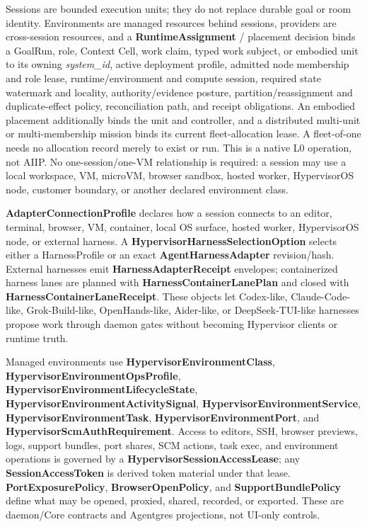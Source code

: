 \documentclass[
  11pt,
]{article}
\begin{document}
Sessions are bounded execution units; they do not replace durable goal or room
identity. Environments are managed resources behind sessions, providers are
cross-session resources, and a
\textbf{RuntimeAssignment} / placement decision binds a GoalRun, role, Context
Cell, work claim, typed work subject, or embodied unit to its owning \emph{system\_id},
active deployment profile, admitted node membership and role lease, runtime/environment and
compute session, required state watermark and locality, authority/evidence
posture, partition/reassignment and duplicate-effect policy, reconciliation
path, and receipt obligations. An embodied placement additionally binds the
unit and controller, and a distributed multi-unit or multi-membership mission
binds its current fleet-allocation lease. A fleet-of-one needs no allocation
record merely to exist or run. This is a native L0 operation, not AIIP. No
one-session/one-VM relationship is
required: a session may use a local workspace, VM, microVM, browser sandbox,
hosted worker, HypervisorOS node, customer boundary, or another declared
environment class.

\textbf{AdapterConnectionProfile} declares how a session connects to an
editor, terminal, browser, VM, container, local OS surface, hosted
worker, HypervisorOS node, or external harness. A
\textbf{HypervisorHarnessSelectionOption} selects either a
HarnessProfile or an exact \textbf{AgentHarnessAdapter} revision/hash. External harnesses
emit \textbf{HarnessAdapterReceipt} envelopes; containerized harness lanes are
planned with \textbf{HarnessContainerLanePlan} and closed with
\textbf{HarnessContainerLaneReceipt}. These objects let Codex-like,
Claude-Code-like, Grok-Build-like, OpenHands-like, Aider-like, or
DeepSeek-TUI-like harnesses propose work through daemon gates without
becoming Hypervisor clients or runtime truth.

Managed environments use \textbf{HypervisorEnvironmentClass},
\textbf{HypervisorEnvironmentOpsProfile},
\textbf{HypervisorEnvironmentLifecycleState},
\textbf{HypervisorEnvironmentActivitySignal},
\textbf{HypervisorEnvironmentService},
\textbf{HypervisorEnvironmentTask},
\textbf{HypervisorEnvironmentPort}, and
\textbf{HypervisorScmAuthRequirement}. Access to editors, SSH, browser
previews, logs, support bundles, port shares, SCM actions, task exec,
and environment operations is governed by a
\textbf{HypervisorSessionAccessLease}; any \textbf{SessionAccessToken}
is derived token material under that lease. \textbf{PortExposurePolicy},
\textbf{BrowserOpenPolicy}, and \textbf{SupportBundlePolicy} define what
may be opened, proxied, shared, recorded, or exported. These are
daemon/Core contracts and Agentgres projections, not UI-only controls.
\end{document}
